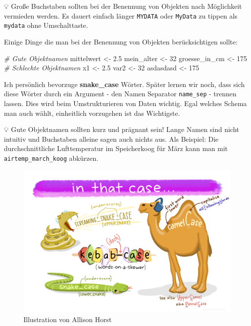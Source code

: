 \documentclass[
]{article}
\newenvironment{Shaded}{\begin{snugshade}}{\end{snugshade}}
\newcommand{\CommentTok}[1]{\textcolor[rgb]{0.56,0.35,0.01}{\textit{#1}}}
\newcommand{\DecValTok}[1]{\textcolor[rgb]{0.00,0.00,0.81}{#1}}
\newcommand{\FloatTok}[1]{\textcolor[rgb]{0.00,0.00,0.81}{#1}}
\newcommand{\NormalTok}[1]{#1}
\newcommand{\OtherTok}[1]{\textcolor[rgb]{0.56,0.35,0.01}{#1}}
\begin{document}
💡 Große Buchstaben sollten bei der Benennung von Objekten nach Möglichkeit vermieden werden. Es dauert einfach länger \texttt{MYDATA} oder \texttt{MyData} zu tippen als \texttt{mydata} ohne Umschalttaste.

Einige Dinge die man bei der Benennung von Objekten berücksichtigen sollte:

\begin{Shaded}
\begin{Highlighting}[]
\CommentTok{\# Gute Objektnamen}
\NormalTok{mittelwert }\OtherTok{\textless{}{-}} \FloatTok{2.5}
\NormalTok{mein\_alter }\OtherTok{\textless{}{-}} \DecValTok{32}
\NormalTok{groesse\_in\_cm }\OtherTok{\textless{}{-}} \DecValTok{175}
\CommentTok{\# Schlechte Objektnamen}
\NormalTok{x1 }\OtherTok{\textless{}{-}} \FloatTok{2.5}
\NormalTok{var2 }\OtherTok{\textless{}{-}} \DecValTok{32}
\NormalTok{asdasdasd }\OtherTok{\textless{}{-}} \DecValTok{175}
\end{Highlighting}
\end{Shaded}

Ich persönlich bevorzuge \textbf{snake\_case} Wörter. Später lernen wir noch, dass sich diese Wörter durch ein Argument - den Namen Separator \texttt{name\_sep} - trennen lassen. Dies wird beim Umstrukturieren von Daten wichtig. Egal welches Schema man auch wählt, einheitlich vorzugehen ist das Wichtigste.

💡 Gute Objektnamen sollten kurz und prägnant sein! Lange Namen sind nicht intuitiv und Buchstaben alleine sagen auch nichts aus. Als Beispiel: Die durchschnittliche Lufttemperatur im Speicherkoog für März kann man mit \texttt{airtemp\_march\_koog} abkürzen.

\begin{figure}

{\centering \includegraphics[width=1\linewidth]{images/016} 

}

\caption{Illustration von Allison Horst}\label{fig:unnamed-chunk-33}
\end{figure}
\end{document}
